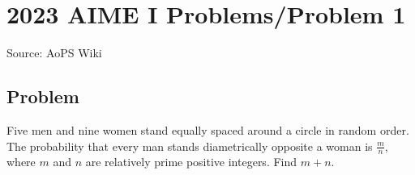 \documentclass[12pt]{article}
\begin{document}
\section*{{2023 AIME I Problems/Problem 1}}
Source: AoPS Wiki

\subsection*{Problem}
Five men and nine women stand equally spaced around a circle in random order. The probability that every man stands diametrically opposite a woman is $\frac{m}{n},$ where $m$ and $n$ are relatively prime positive integers. Find $m+n.$
\end{document}

